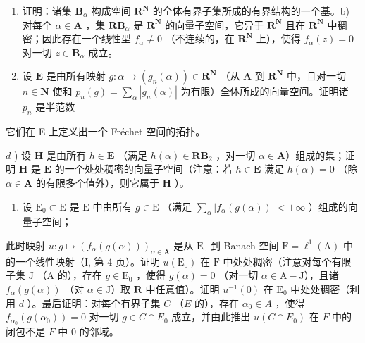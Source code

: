 \begin{enumerate}
\def\labelenumi{\alph{enumi})}
\item
  证明：诸集 \(\mathbf{B}_{\alpha}\) 构成空间 \(\mathbf{R}^{\mathbf{N}}\) 的全体有界子集所成的有界结构的一个基。b) 对每个 \(\alpha \in \mathbf{A}\) ，集 \(\mathbf{RB}_{\alpha}\) 是 \(\mathbf{R}^{\mathbf{N}}\) 的向量子空间，它异于 \(\mathbf{R}^{\mathbf{N}}\) 且在 \(\mathbf{R}^{\mathbf{N}}\) 中稠密；因此存在一个线性型 \(f_{\alpha} \neq 0\) （不连续的，在 \(\mathbf{R}^{\mathbf{N}}\) 上），使得 \(f_{\alpha}(z) = 0\) 对一切 \(z \in \mathbf{B}_{\alpha}\) 成立。
\item
  设 \(\mathbf{E}\) 是由所有映射 \(g: \alpha \mapsto (g_n(\alpha)) \in \mathbf{R}^{\mathbf{N}}\) （从 \(\mathbf{A}\) 到 \(\mathbf{R}^{\mathbf{N}}\) 中，且对一切 \(n \in \mathbf{N}\) 使和 \(p_n(g) = \sum_{\alpha} |g_n(\alpha)|\) 为有限）全体所成的向量空间。证明诸 \(p_n\) 是半范数
\end{enumerate}

它们在 E 上定义出一个 Fréchet 空间的拓扑。

\(d\) ) 设 \(\mathbf{H}\) 是由所有 \(h\in \mathbf{E}\) （满足 \(h(\alpha)\in \mathbf{RB}_2\) ，对一切 \(\alpha \in \mathbf{A}\)）组成的集；证明 \(\mathbf{H}\) 是 \(\mathbf{E}\) 的一个处处稠密的向量子空间（注意：若 \(h\in \mathbf{E}\) 满足 \(h(\alpha) = 0\) （除 \(\alpha \in \mathbf{A}\) 的有限多个值外），则它属于 \(\mathbf{H}\) ）。

\begin{enumerate}
\def\labelenumi{\alph{enumi})}
\setcounter{enumi}{4}
\tightlist
\item
  设 \(\mathrm{E}_0 \subset \mathrm{E}\) 是 \(\mathrm{E}\) 中由所有 \(g \in \mathrm{E}\) （满足 \(\sum_{\alpha} |f_{\alpha}(g(\alpha))| < +\infty\) ）组成的向量子空间；
\end{enumerate}

此时映射 \(u: g \mapsto (f_{\alpha}(g(\alpha)))_{\alpha \in \mathbf{A}}\) 是从 \(\mathrm{E}_0\) 到 Banach 空间 \(\mathrm{F} = \ell^1(\mathrm{A})\) 中的一个线性映射（I, 第 4 页）。证明 \(u(\mathrm{E}_0)\) 在 \(\mathrm{F}\) 中处处稠密（注意对每个有限子集 \(\mathrm{J}\) （\(\mathrm{A}\) 的），存在 \(g \in \mathrm{E}_0\) ，使得 \(g(\alpha) = 0\) （对一切 \(\alpha \in \mathrm{A} - \mathrm{J}\)），且诸 \(f_{\alpha}(g(\alpha))\) （对 \(\alpha \in \mathrm{J}\)）取 \(\mathbf{R}\) 中任意值）。证明 \(u^{-1}(0)\) 在 \(\mathrm{E}_0\) 中处处稠密（利用 \(d\) ）。最后证明：对每个有界子集 \(C\) （\(E\) 的），存在 \(\alpha_0 \in A\) ，使得 \(f_{\alpha_0}(g(\alpha_0)) = 0\) 对一切 \(g \in C \cap E_0\) 成立，并由此推出 \(u(C \cap E_0)\) 在 \(F\) 中的闭包不是 \(F\) 中 0 的邻域。

